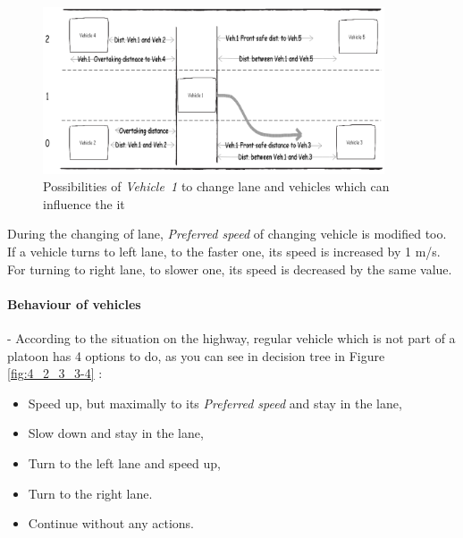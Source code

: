 \begin{figure}[ph]
\centering
\includegraphics[width=0.90\textwidth,height=0.90\textheight,keepaspectratio]{figures/Chapter_4/4_changing_lanes.png}
\centering
\protect\caption{\label{fig:4_2_3_3-3}Possibilities of \textit{\mbox{Vehicle 1}} to change lane and vehicles which can influence the it}
\end{figure}

During the changing of lane, \textit{Preferred speed} of changing vehicle is modified too. If a vehicle turns to left lane, to the faster one, its speed is increased by 1 m/s. For turning to right lane, to slower one, its speed is decreased by the same value.

\paragraph{Behaviour of vehicles}

- According to the situation on the highway, regular vehicle which is not part of a platoon has 4 options to do, as you can see in decision tree in Figure \ref{fig:4_2_3_3-4} :

\begin{itemize}
\item Speed up, but maximally to its \textit{Preferred speed} and stay in the lane, 
\item Slow down and stay in the lane,
\item Turn to the left lane and speed up, 
\item Turn to the right lane. 
\item Continue without any actions. 
\end{itemize}

